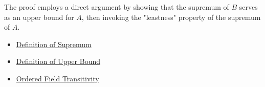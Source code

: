\begin{remark*}
The proof employs a direct argument by showing that the supremum of $B$ serves as an upper bound for $A$, then invoking the "leastness" property of the supremum of $A$.
\end{remark*}

\begin{dependencies}
\begin{itemize}
  \item \hyperref[def:supremum]{Definition of Supremum}
  \item \hyperref[def:upper-bound]{Definition of Upper Bound}
  \item \hyperref[thm:ordered-field-transitivity]{Ordered Field Transitivity}
\end{itemize}
\end{dependencies}

\clearpage
